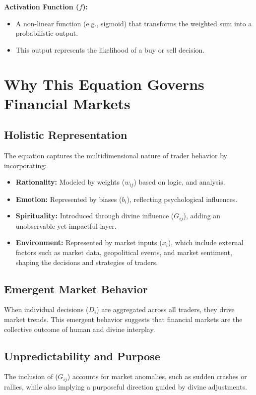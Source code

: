 \documentclass[a4]{article}
\newcommand{\bn}{\bigskip\noindent}
\begin{document}
\bn
{\bf Activation Function ($f$):}

\begin{itemize}
\item  A non-linear function (e.g., sigmoid) that transforms the weighted sum into a probabilistic output.
\item This output represents the likelihood of a buy or sell decision.
\end{itemize}



\bn
\section{Why This Equation Governs Financial Markets}

\subsection{Holistic Representation}

The equation captures the multidimensional nature of trader behavior by incorporating:

\begin{itemize}
\item  {\bf Rationality:}  Modeled by weights ($w_{ij}$) based on logic, and analysis.
\item {\bf Emotion:}  Represented by biases ($b_i$), reflecting psychological influences.
\item  {\bf Spirituality:}  Introduced through divine influence ($G_{ij}$), adding an unobservable yet impactful layer.
\item {\bf Environment:}  Represented by market inputs ($x_i$), which include external factors such as market data, geopolitical events, and market sentiment, shaping the decisions and strategies of traders.
\end{itemize}

\subsection{Emergent Market Behavior}
When individual decisions ($D_i$) are aggregated across all traders, they drive market trends. This emergent behavior suggests that financial markets are the collective outcome of human and divine interplay.

\subsection{Unpredictability and Purpose}
The inclusion of ($G_{ij}$) accounts for market anomalies, such as sudden crashes or rallies, while also implying a purposeful direction guided by divine adjustments.
\end{document}
